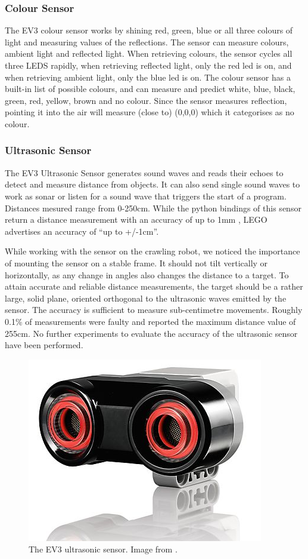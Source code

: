 \documentclass[11pt, a4paper]{article}
\begin{document}
\subsubsection*{Colour Sensor}
The EV3 colour sensor works by shining red, green, blue or all three colours of light and measuring values of the reflections. The sensor can measure colours, ambient light and reflected light. When retrieving colours, the sensor cycles all three LEDS rapidly, when retrieving reflected light, only the red led is on, and when retrieving ambient light, only the blue led is on\cite{colour_sensor_python}. The colour sensor has a built-in list of possible colours, and can measure and predict white, blue, black, green, red, yellow, brown and no colour. Since the sensor measures reflection, pointing it into the air will measure (close to) (0,0,0) which it categorises as no colour.

\subsubsection*{Ultrasonic Sensor}
The EV3 Ultrasonic Sensor generates sound waves and reads their echoes to detect and measure distance from objects. It can also send single sound waves to work as sonar or listen for a sound wave that triggers the start of a program. Distances mesured range from 0-250cm. While the python bindings of this sensor return a distance measurement with an accuracy of up to 1mm \cite{ev3_python}, LEGO advertises an accuracy of  ``up to +/-1cm''. \cite{ultraosnic_sensor}

While working with the sensor on the crawling robot, we noticed the importance of mounting the sensor on a stable frame. It should not tilt vertically or horizontally, as any change in angles also changes the distance to a target. To attain accurate and reliable distance measurements, the target should be a rather large, solid plane, oriented orthogonal to the ultrasonic waves emitted by the sensor. The accuracy is sufficient to measure sub-centimetre movements. Roughly 0.1\% of measurements were faulty and reported the maximum distance value of 255cm. No further experiments to evaluate the accuracy of the ultrasonic sensor have been performed.

\begin{figure}[H]
	\centering
	\includegraphics[width=0.3\linewidth]{images/ultrasonic}
	\caption{The EV3 ultrasonic sensor. Image from \cite{ultraosnic_sensor}.}
	\label{fig:ultrasonic}
\end{figure}
\end{document}
